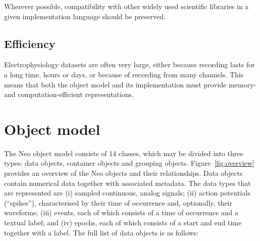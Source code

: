 \documentclass{frontiers}
\begin{document}
Wherever possible, compatibility with other widely used scientific libraries in a given implementation language should be preserved.

\subsection{Efficiency}

Electrophysiology datasets are often very large, either because recording lasts for a long time, hours or days, or because of recording from many channels. This means that both the object model and its implementation must provide memory- and computation-efficient representations.


\section{Object model}


The Neo object model consists of 14 classes, which may be divided into three types: data objects, container objects and grouping objects. Figure~\ref{fig:overview} provides an overview of the Neo objects and their relationships.
Data objects contain numerical data together with associated metadata.
The data types that are represented are 
(i) sampled continuous, analog signals; 
(ii) action potentials (``spikes''), characterised by their time of occurrence and, optionally, their waveforms; 
(iii) events, each of which consists of a time of occurrence and a textual label; and 
(iv) epochs, each of which consists of a start and end time together with a label.
The full list of data objects is as follows:
\end{document}
